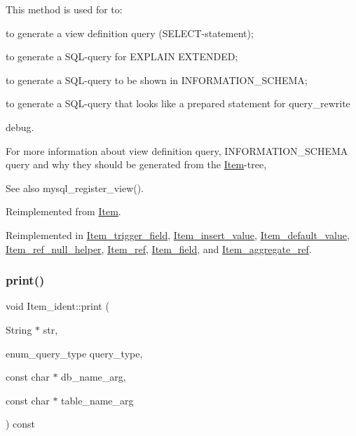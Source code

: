 This method is used for to\+:
\begin{DoxyItemize}
\item to generate a view definition query (S\+E\+L\+E\+CT-\/statement);
\item to generate a S\+QL-\/query for E\+X\+P\+L\+A\+IN E\+X\+T\+E\+N\+D\+ED;
\item to generate a S\+QL-\/query to be shown in I\+N\+F\+O\+R\+M\+A\+T\+I\+O\+N\+\_\+\+S\+C\+H\+E\+MA;
\item to generate a S\+QL-\/query that looks like a prepared statement for query\+\_\+rewrite
\item debug.
\end{DoxyItemize}

For more information about view definition query, I\+N\+F\+O\+R\+M\+A\+T\+I\+O\+N\+\_\+\+S\+C\+H\+E\+MA query and why they should be generated from the \mbox{\hyperlink{classItem}{Item}}-\/tree, \begin{DoxySeeAlso}{See also}
mysql\+\_\+register\+\_\+view(). 
\end{DoxySeeAlso}


Reimplemented from \mbox{\hyperlink{classItem_aa7ba4bde739d83adec8edf3bf1596d94}{Item}}.



Reimplemented in \mbox{\hyperlink{classItem__trigger__field_a68115abf242013d5b319a0c3c58c5384}{Item\+\_\+trigger\+\_\+field}}, \mbox{\hyperlink{classItem__insert__value_abbba2f565d5a63803b693a03f7184d14}{Item\+\_\+insert\+\_\+value}}, \mbox{\hyperlink{classItem__default__value_adc863c4577d7c10a0cbf1c006c8087a6}{Item\+\_\+default\+\_\+value}}, \mbox{\hyperlink{classItem__ref__null__helper_a89293e68530fb3b07572c5005c3220c8}{Item\+\_\+ref\+\_\+null\+\_\+helper}}, \mbox{\hyperlink{classItem__ref_a90c0289e8983ca73c75eaa92bc762cf6}{Item\+\_\+ref}}, \mbox{\hyperlink{classItem__field_a40b28e2bc9886f81e8ad19c64efb1408}{Item\+\_\+field}}, and \mbox{\hyperlink{classItem__aggregate__ref_ae6a411b0088c79b64443138fcc3625ba}{Item\+\_\+aggregate\+\_\+ref}}.

\mbox{\label{classItem__ident_a4ab5d9635a58d5ab39aefc45bb70a09d}} 
\subsubsection{\texorpdfstring{print()}{print()}\hspace{0.1cm}{\footnotesize\ttfamily [2/2]}}
{\footnotesize\ttfamily void Item\+\_\+ident\+::print (\begin{DoxyParamCaption}\item[{String $\ast$}]{str,  }\item[{enum\+\_\+query\+\_\+type}]{query\+\_\+type,  }\item[{const char $\ast$}]{db\+\_\+name\+\_\+arg,  }\item[{const char $\ast$}]{table\+\_\+name\+\_\+arg }\end{DoxyParamCaption}) const\hspace{0.3cm}{\ttfamily [protected]}}


